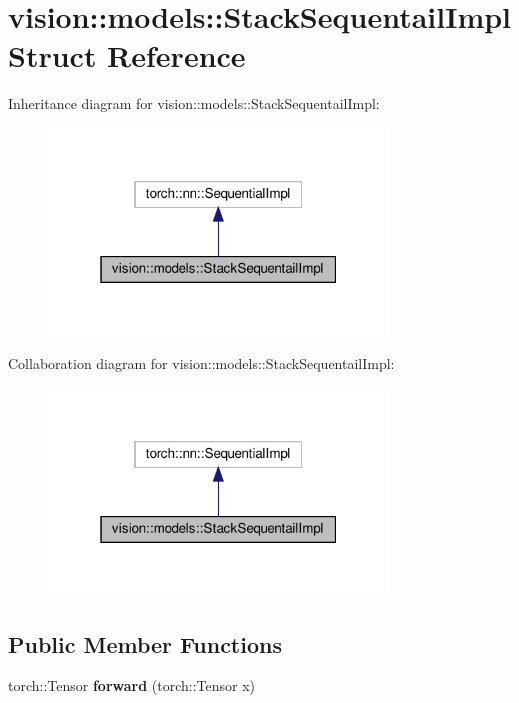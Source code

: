\hypertarget{structvision_1_1models_1_1StackSequentailImpl}{}\section{vision\+:\+:models\+:\+:Stack\+Sequentail\+Impl Struct Reference}
\label{structvision_1_1models_1_1StackSequentailImpl}


Inheritance diagram for vision\+:\+:models\+:\+:Stack\+Sequentail\+Impl\+:
\nopagebreak
\begin{figure}[H]
\begin{center}
\leavevmode
\includegraphics[width=256pt]{structvision_1_1models_1_1StackSequentailImpl__inherit__graph}
\end{center}
\end{figure}


Collaboration diagram for vision\+:\+:models\+:\+:Stack\+Sequentail\+Impl\+:
\nopagebreak
\begin{figure}[H]
\begin{center}
\leavevmode
\includegraphics[width=256pt]{structvision_1_1models_1_1StackSequentailImpl__coll__graph}
\end{center}
\end{figure}
\subsection*{Public Member Functions}
\begin{DoxyCompactItemize}
\item 
\mbox{\label{structvision_1_1models_1_1StackSequentailImpl_a0c181115bcf266305fdc56e408a32c3d}} 
torch\+::\+Tensor {\bfseries forward} (torch\+::\+Tensor x)
\end{DoxyCompactItemize}



